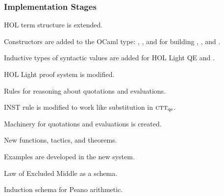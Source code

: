 \documentclass[t,12pt,numbers,fleqn]{beamer}
\newcommand{\churchqe}{$\mbox{\sc ctt}_{\rm qe}$}
\begin{document}
\begin{frame}
\frametitle{Implementation Stages}
\be

  \item HOL term structure is extended.

  \bi

    \item Constructors are added to the OCaml type: ,
      , and  for building
      , , and
      .

    \item Inductive types of syntactic values are added for HOL Light
      QE  and .

  \ei

  \item HOL Light proof system is modified.

  \bi

    \item Rules for reasoning about quotations and evaluations.

    \item INST rule is modified to work like substitution in
      {\churchqe}.

  \ei

  \item Machinery for quotations and evaluations is created.

  \bi

    \item New functions, tactics, and theorems.

  \ei

  \item Examples are developed in the new system.

  \bi

    \item Law of Excluded Middle as a schema.

    \item Induction schema for Peano arithmetic.

  \ei

\ee
\end{frame}

\end{document}
